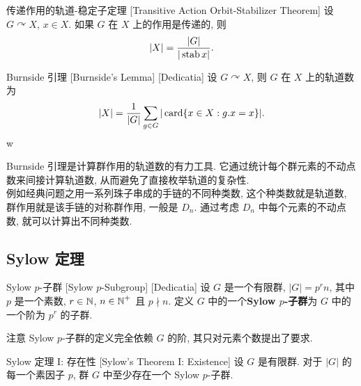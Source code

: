         \begin{crl}
            {传递作用的轨道-稳定子定理}
            [Transitive Action Orbit-Stabilizer Theorem]
            设 \(G \curvearrowright X\), \(x\in X\). 如果 \(G\) 在 \(X\) 上的作用是传递的, 则
            \[|X|=\frac{|G|}{|\operatorname{stab} x|}.\]
        \end{crl}

        \begin{thm}
            {Burnside 引理}
            [Burnside's Lemma]
            [Dedicatia]
            设 \(G \curvearrowright X\), 则 \(G\) 在 \(X\) 上的轨道数为
            \[|X|=\frac{1}{|G|}\sum_{g\in G}|\operatorname{card}\{x\in X: g.x=x\}|.\]w
        \end{thm}

        \begin{rmk}
            [Dedicatia]
            Burnside 引理是计算群作用的轨道数的有力工具. 它通过统计每个群元素的不动点数来间接计算轨道数, 从而避免了直接枚举轨道的复杂性.\\
            例如经典问题之用一系列珠子串成的手链的不同种类数, 这个种类数就是轨道数, 群作用就是该手链的对称群作用, 一般是 \(D_n\). 通过考虑 \(D_n\) 中每个元素的不动点数, 就可以计算出不同种类数.
        \end{rmk}

    \subsection{Sylow 定理}

        \begin{dfn}
            {Sylow $p$-子群}
            [Sylow $p$-Subgroup]
            [Dedicatia]
            设 $G$ 是一个有限群, \(|G|=p^rn\), 其中 \(p\) 是一个素数, \(r\in\operatorname{\mathbb{N}}\), \(n\in\operatorname{\mathbb{N}}^+\) 且 \(p\nmid n\). 定义 \(G\) 中的一个\textbf{Sylow $p$-子群}为 \(G\) 中的一个阶为 \(p^r\) 的子群.
        \end{dfn}

        \begin{rmk}
            [Dedicatia]
            注意 Sylow $p$-子群的定义完全依赖 \(G\) 的阶, 其只对元素个数提出了要求.
        \end{rmk}

        \begin{thm}
            [Sylow1]
            {Sylow 定理 I: 存在性}
            [Sylow's Theorem I: Existence]
            设 \(G\) 是有限群. 对于 $|G|$ 的每一个素因子 $p$, 群 $G$ 中至少存在一个 Sylow $p$-子群.
        \end{thm}

